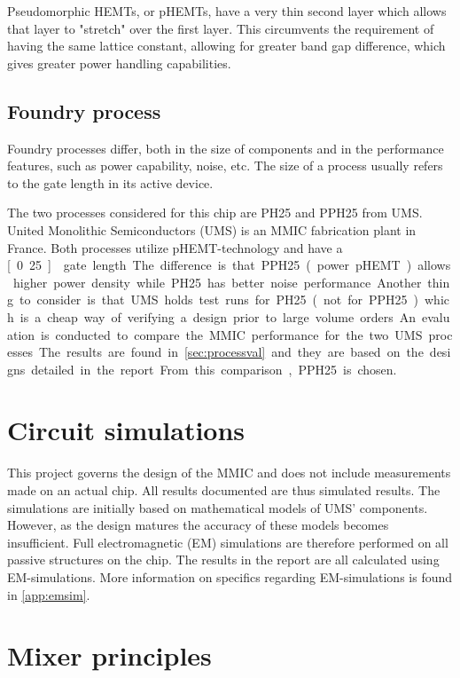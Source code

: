 			Pseudomorphic HEMTs, or pHEMTs, have a very thin second layer which allows that layer to "stretch" over the first layer. This circumvents the requirement of having the same lattice constant, allowing for greater band gap difference, which gives greater power handling capabilities.

		\subsection{Foundry process}
			Foundry processes differ, both in the size of components and in the performance features, such as power capability, noise, etc. The size of a process usually refers to the gate length in its active device.

			The two processes considered for this chip are PH25 and PPH25 from UMS. United Monolithic Semiconductors (UMS) is an MMIC fabrication plant in France. Both processes utilize pHEMT-technology and have a \unit[0.25]{\mum} gate length. The difference is that PPH25 (power pHEMT) allows higher power density while PH25 has better noise performance. Another thing to consider is that UMS holds test runs for PH25 (not for PPH25) which is a cheap way of verifying a design prior to large volume orders.

			An evaluation is conducted to compare the MMIC performance for the two UMS processes. The results are found in \autoref{sec:processval} and they are based on the designs detailed in the report. From this comparison, PPH25 is chosen.

	\section{Circuit simulations}
		This project governs the design of the MMIC and does not include measurements made on an actual chip. All results documented are thus simulated results. The simulations are initially based on mathematical models of UMS' components. However, as the design matures the accuracy of these models becomes insufficient. Full electromagnetic (EM) simulations are therefore performed on all passive structures on the chip. The results in the report are all calculated using EM-simulations. More information on specifics regarding EM-simulations is found in \autoref{app:emsim}.

	\section{Mixer principles}\label{ch:introduction_mixer}
